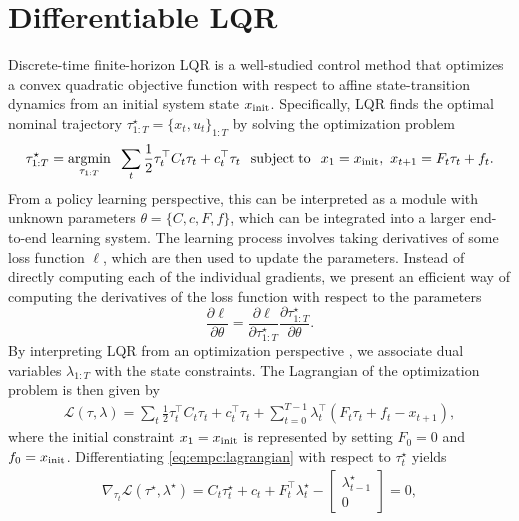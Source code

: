 \section{Differentiable LQR}
\label{sec:empc:diff-lqr}
Discrete-time finite-horizon LQR is a well-studied control method
that optimizes a convex quadratic objective function
with respect to affine state-transition dynamics
from an initial system state $x_{\rm init}$.
Specifically, LQR finds the optimal nominal trajectory
$\tau_{1:T}^\star = \{x_t, u_t\}_{1:T}$
by solving the optimization problem
\begin{equation}
  \label{eq:empc:lqr}
    \tau^{\star}_{1:T} = \operatorname*{argmin}_{\tau_{1:T}}\;\;
    \sum_{t} \frac{1}{2} \tau_t^\top  C_t \tau_t + c_t^\top  \tau_t \;\;
    \operatorname*{subject\;to}\;\;
    x_1 = x_{\rm init},\
    x_{t+1} = F_t\tau_t + f_t.
\end{equation}
From a policy learning perspective, this can be interpreted as a
module with unknown parameters $\theta=\{C, c, F, f\}$, which can
be integrated into a larger end-to-end learning system.
The learning process involves taking derivatives of some loss function
$\ell$, which are then used to update the parameters.
Instead of directly computing each of the individual gradients, we present
an efficient way of computing the derivatives of the loss function with
respect to the parameters
\begin{equation}
  \frac{\partial\ell}{\partial\theta} =
  \frac{\partial\ell}{\partial\tau_{1:T}^\star}
  \frac{\partial\tau_{1:T}^\star}{\partial\theta}.
\end{equation}
By interpreting LQR from an optimization perspective
\citep{boyd2008lqr}, we associate dual variables
$\lambda_{1:T}$ with the state constraints.
The Lagrangian of the optimization problem is then given by
\begin{align}
  \label{eq:empc:lagrangian}
  \mathcal{L}(\tau, \lambda) =
    \sum_t \frac{1}{2} \tau_t^\top C_t \tau_t + c_t^\top \tau_t +
    \sum_{t=0}^{T-1}\lambda_t^\top (F_t\tau_t + f_t - x_{t+1}),
\end{align}
where the initial constraint $x_1=x_{\rm init}$ is represented by
setting $F_0=0$ and $f_0=x_{\rm init}$.
Differentiating \cref{eq:empc:lagrangian} with respect to
$\tau_t^\star$ yields
\begin{align}
  \label{eq:empc:lqr_lagrangian_diff}
  \nabla_{\tau_t}\mathcal{L}(\tau^\star, \lambda^\star) =
     C_t \tau_t^\star + c_t + F_t^\top \lambda_t^\star -
  \begin{bmatrix}
    \lambda_{t-1}^\star \\
    0
  \end{bmatrix}
  = 0,
\end{align}

